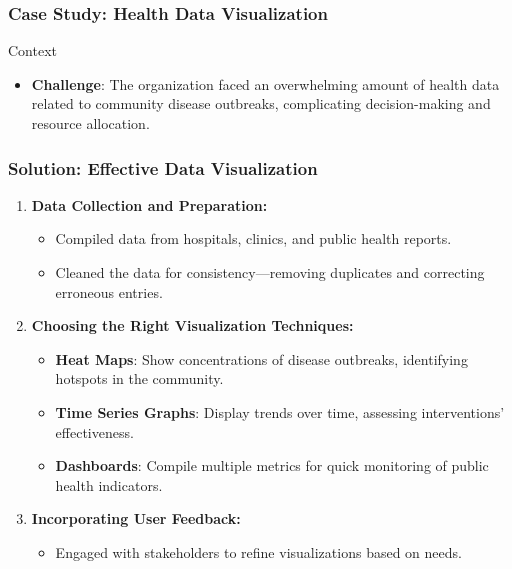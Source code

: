 \documentclass[aspectratio=169]{beamer}
\begin{document}
\begin{frame}[fragile]
    \frametitle{Case Study: Health Data Visualization}
    \begin{block}{Context}
        \begin{itemize}
            \item \textbf{Challenge}: The organization faced an overwhelming amount of health 
            data related to community disease outbreaks, complicating decision-making and 
            resource allocation.
        \end{itemize}
    \end{block}
\end{frame}

\begin{frame}[fragile]
    \frametitle{Solution: Effective Data Visualization}
    \begin{enumerate}
        \item \textbf{Data Collection and Preparation:}
            \begin{itemize}
                \item Compiled data from hospitals, clinics, and public health reports.
                \item Cleaned the data for consistency—removing duplicates and correcting 
                erroneous entries.
            \end{itemize}

        \item \textbf{Choosing the Right Visualization Techniques:}
            \begin{itemize}
                \item \textbf{Heat Maps}: Show concentrations of disease outbreaks, identifying 
                hotspots in the community.
                \item \textbf{Time Series Graphs}: Display trends over time, assessing 
                interventions' effectiveness.
                \item \textbf{Dashboards}: Compile multiple metrics for quick monitoring of 
                public health indicators.
            \end{itemize}
        
        \item \textbf{Incorporating User Feedback:}
            \begin{itemize}
                \item Engaged with stakeholders to refine visualizations based on needs.
            \end{itemize}
    \end{enumerate}
\end{frame}
\end{document}
